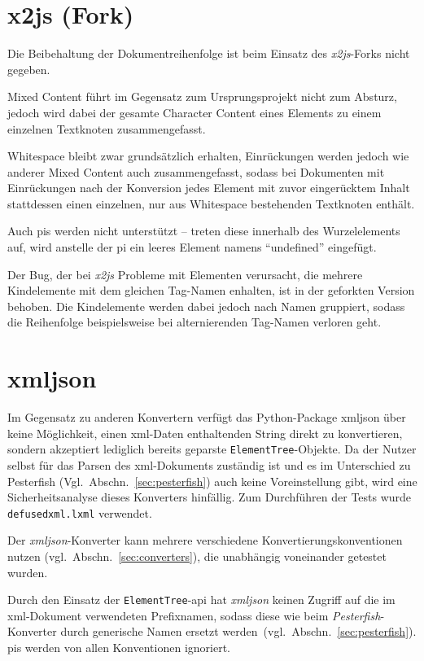 \section{x2js (Fork)}
\label{sec:x2js-fork}

Die Beibehaltung der Dokumentreihenfolge ist beim Einsatz des \emph{x2js}-Forks nicht gegeben.

Mixed Content führt im Gegensatz zum Ursprungsprojekt nicht zum Absturz, jedoch wird dabei der gesamte Character Content eines Elements zu einem einzelnen Textknoten zusammengefasst.

Whitespace bleibt zwar grundsätzlich erhalten, Einrückungen werden jedoch wie anderer Mixed Content auch zusammengefasst, sodass bei Dokumenten mit Einrückungen nach der Konversion jedes Element mit zuvor eingerücktem Inhalt stattdessen einen einzelnen, nur aus Whitespace bestehenden Textknoten enthält.

Auch \glspl{pi} werden nicht unterstützt -- treten diese innerhalb des Wurzelelements auf, wird anstelle der \gls{pi} ein leeres Element namens \enquote{undefined} eingefügt.

Der Bug, der bei \emph{x2js} Probleme mit Elementen verursacht, die mehrere Kindelemente mit dem gleichen Tag-Namen enhalten, ist in der geforkten Version behoben. Die Kindelemente werden dabei jedoch nach Namen gruppiert, sodass die Reihenfolge beispielsweise bei alternierenden Tag-Namen verloren geht.

\section{xmljson}
\label{sec:xmljson}

Im Gegensatz zu anderen Konvertern verfügt das Python-Package xmljson über keine Möglichkeit, einen \acrshort{xml}-Daten enthaltenden String direkt zu konvertieren, sondern akzeptiert lediglich bereits geparste \texttt{ElementTree}-Objekte. Da der Nutzer selbst für das Parsen des \acrshort{xml}-Dokuments zuständig ist und es im Unterschied zu Pesterfish (Vgl.~Abschn.~\ref{sec:pesterfish}) auch keine Voreinstellung gibt, wird eine Sicherheitsanalyse dieses Konverters hinfällig. Zum Durchführen der Tests wurde \texttt{defusedxml.lxml} verwendet.

Der \emph{xmljson}-Konverter kann mehrere verschiedene Konvertierungskonventionen nutzen (vgl.~Abschn.~\ref{sec:converters}), die unabhängig voneinander getestet wurden.

Durch den Einsatz der \texttt{ElementTree}-\acrshort{api} hat \emph{xmljson} keinen Zugriff auf die im \acrshort{xml}-Dokument verwendeten Prefixnamen, sodass diese wie beim \emph{Pesterfish}-Konverter durch generische Namen ersetzt werden~(vgl.~Abschn.~\ref{sec:pesterfish}).
\glspl{pi} werden von allen Konventionen ignoriert.

